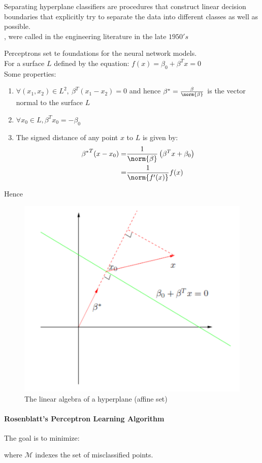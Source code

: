 Separating hyperplane classifiers are procedures that construct linear decision boundaries that
explicitly try to separate the data into different classes as well as possible.\\
, were
called  in the engineering literature in the late $1950's$

Perceptrons set te foundations for the neural network models.\\
For a surface $L$ defined by the equation: $f(x)=\beta_{0}+\beta^{T}x=0$\\
Some properties:
\begin{enumerate}
	\item $\forall (x_{1}, x_{2})\in L^{2},~\beta^{T}(x_{1}-x_{2})=0$ and hence $\beta^{*}=
		\frac{\beta}{\norm{\beta}}$ is the vector normal to the surface $L$
	\item $\forall x_{0}\in L, \beta^{T}x_{0} = -\beta_{0}$
	\item The signed distance of any point $x$ to $L$ is given by:
		\begin{align*}
			{\beta^{*}}^{T}(x-x_{0}) =& \frac{1}{\norm{\beta}}\left( \beta^{T}x+
			\beta_{0} \right)\\
			=& \frac{1}{\norm{f'(x)}}{f(x)}
		\end{align*}
\end{enumerate}
Hence 
\begin{figure}[H]
	\begin{center}
		\includegraphics[width=.4\textwidth]{./chap/1chap/3sec/8images/1_hyperplaneAffine.PNG}
	\end{center}
	\caption{The linear algebra of a hyperplane (affine set)}
	\label{fig:1_hyperplaneAffine}
\end{figure}

\paragraph{Rosenblatt's Perceptron Learning Algorithm}
 The goal is to minimize: 
\begin{center}
\end{center}
where $\mathcal{M}$ indexes the set of misclassified points.

